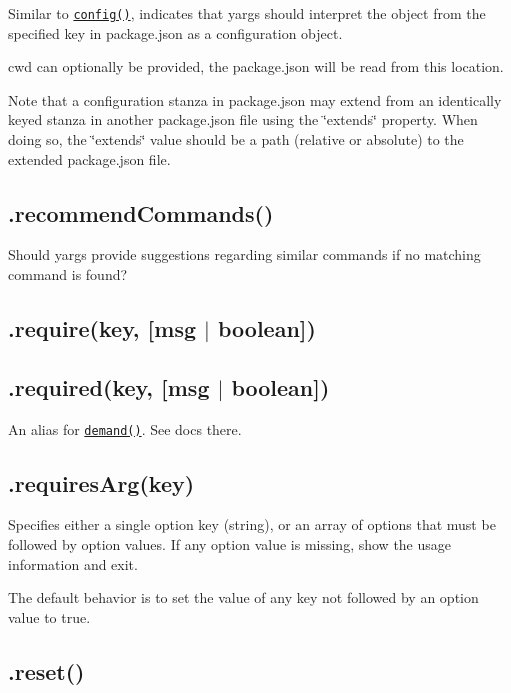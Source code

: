 Similar to \href{#config}{\tt {\ttfamily config()}}, indicates that yargs should interpret the object from the specified key in package.\+json as a configuration object.

{\ttfamily cwd} can optionally be provided, the package.\+json will be read from this location.

Note that a configuration stanza in package.\+json may extend from an identically keyed stanza in another package.\+json file using the {\ttfamily \char`\"{}extends\char`\"{}} property. When doing so, the {\ttfamily \char`\"{}extends\char`\"{}} value should be a path (relative or absolute) to the extended package.\+json file.

\subsection*{.recommend\+Commands() }

Should yargs provide suggestions regarding similar commands if no matching command is found?

\subsection*{.require(key, \mbox{[}msg $\vert$ boolean\mbox{]}) }

\subsection*{.required(key, \mbox{[}msg $\vert$ boolean\mbox{]}) }

An alias for \href{#demand}{\tt {\ttfamily demand()}}. See docs there.

\subsection*{\label{_requiresArg}%
.requires\+Arg(key) }

Specifies either a single option key (string), or an array of options that must be followed by option values. If any option value is missing, show the usage information and exit.

The default behavior is to set the value of any key not followed by an option value to {\ttfamily true}.

\subsection*{\label{_reset}%
.reset() }

